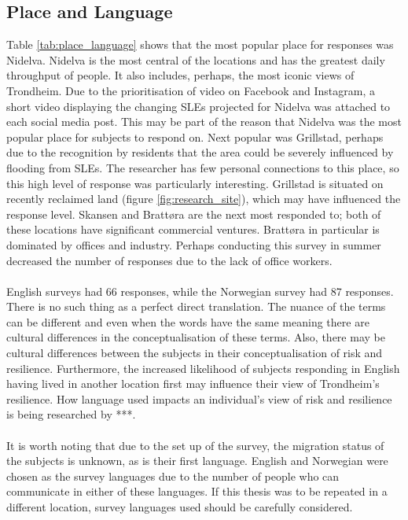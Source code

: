 \subsection{Place and Language}
Table \ref{tab:place_language} shows that the most popular place for responses was Nidelva. Nidelva is the most central of the locations and has the greatest daily throughput of people. It also includes, perhaps, the most iconic views of Trondheim. Due to the prioritisation of video on Facebook and Instagram, a short video displaying the changing SLEs projected for Nidelva was attached to each social media post. This may be part of the reason that Nidelva was the most popular place for subjects to respond on.  Next popular was Grillstad, perhaps due to the recognition by residents that the area could be severely influenced by flooding from SLEs. The researcher has few personal connections to this place, so this high level of response was particularly interesting. Grillstad is situated on recently reclaimed land (figure \ref{fig:research_site}), which may have influenced the response level. Skansen and Brattøra are the next most responded to; both of these locations have significant commercial ventures. Brattøra in particular is dominated by offices and industry. Perhaps conducting this survey in summer decreased the number of responses due to the lack of office workers. 
\paragraph{}
English surveys had 66 responses, while the Norwegian survey had 87 responses. There is no such thing as a perfect direct translation. The nuance of the terms can be different and even when the words have the same meaning there are cultural differences in the conceptualisation of these terms. Also, there may be cultural differences between the subjects in their conceptualisation of risk and resilience. Furthermore, the increased likelihood of subjects responding in English having lived in another location first may influence their view of Trondheim's resilience. How language used impacts an individual's view of risk and resilience is being researched by ***.

\paragraph{}
It is worth noting that due to the set up of the survey, the migration status of the subjects is unknown, as is their first language. English and Norwegian were chosen as the survey languages due to the number of people who can communicate in either of these languages. If this thesis was to be repeated in a different location, survey languages used should be carefully considered.


